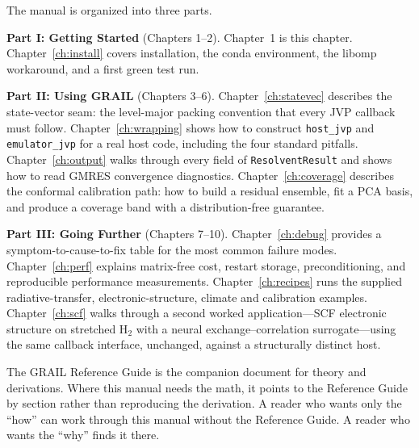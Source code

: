 The manual is organized into three parts.

\medskip

\noindent\textbf{Part I: Getting Started} (Chapters 1--2).
Chapter~1 is this chapter.
Chapter~\ref{ch:install} covers installation, the conda environment, the
libomp workaround, and a first green test run.

\medskip

\noindent\textbf{Part II: Using GRAIL} (Chapters 3--6).
Chapter~\ref{ch:statevec} describes the state-vector seam: the
level-major packing convention that every JVP callback must follow.
Chapter~\ref{ch:wrapping} shows how to construct \texttt{host\_jvp} and
\texttt{emulator\_jvp} for a real host code, including the four standard
pitfalls.
Chapter~\ref{ch:output} walks through every field of \texttt{ResolventResult}
and shows how to read GMRES convergence diagnostics.
Chapter~\ref{ch:coverage} describes the conformal calibration path: how to
build a residual ensemble, fit a PCA basis, and produce a coverage band with
a distribution-free guarantee.

\medskip

\noindent\textbf{Part III: Going Further} (Chapters 7--10).
Chapter~\ref{ch:debug} provides a symptom-to-cause-to-fix table for the
most common failure modes.
Chapter~\ref{ch:perf} explains matrix-free cost, restart storage,
preconditioning, and reproducible performance measurements.
Chapter~\ref{ch:recipes} runs the supplied radiative-transfer,
electronic-structure, climate and calibration examples.
Chapter~\ref{ch:scf} walks through a second worked application---SCF
electronic structure on stretched H$_2$ with a neural exchange--correlation
surrogate---using the same callback interface, unchanged, against a
structurally distinct host.

\medskip

The GRAIL Reference Guide is the companion document for theory and derivations.
Where this manual needs the math, it points to the Reference Guide by section
rather than reproducing the derivation.
A reader who wants only the ``how'' can work through this manual without the
Reference Guide.
A reader who wants the ``why'' finds it there.

